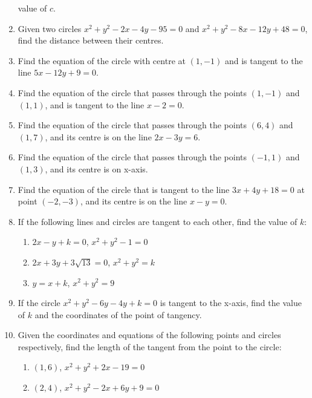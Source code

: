 \documentclass{report}
\begin{document}
\begin{multicols}{2}
\begin{enumerate}
                  value of $c$.
            \item Given two circles $x^2 + y^2 - 2x - 4y - 95 = 0$ and $x^2 + y^2 - 8x - 12y + 48
                        = 0$, find the distance between their centres.
            \item Find the equation of the circle with centre at $(1, -1)$ and is tangent to the
                  line $5x - 12y + 9 = 0$.
            \item Find the equation of the circle that passes through the points $(1, -1)$ and
                  $(1, 1)$, and is tangent to the line $x - 2 = 0$.
            \item Find the equation of the circle that passes through the points $(6, 4)$ and
                  $(1, 7)$, and its centre is on the line $2x - 3y = 6$.
            \item Find the equation of the circle that passes through the points $(-1, 1)$ and
                  $(1, 3)$, and its centre is on x-axis.
            \item Find the equation of the circle that is tangent to the line $3x + 4y + 18 = 0$
                  at point $(-2, -3)$, and its centre is on the line $x - y = 0$.
            \item If the following lines and circles are tangent to each other, find the value of
                  $k$:
                  \begin{enumerate}
                        \item $2x - y + k = 0$, $x^2 + y^2 - 1 = 0$
                        \item $2x + 3y + 3\sqrt{13} = 0$, $x^2 + y^2 = k$
                        \item $y = x + k$, $x^2 + y^2 = 9$
                  \end{enumerate}
            \item If the circle $x^2 + y^2 - 6y - 4y + k = 0$ is tangent to the x-axis, find the
                  value of $k$ and the coordinates of the point of tangency.
            \item Given the coordinates and equations of the following points and circles
                  respectively, find the length of the tangent from the point to the circle:
                  \begin{enumerate}
                        \item $(1, 6)$, $x^2 + y^2 + 2x - 19 = 0$
                        \item $(2, 4)$, $x^2 + y^2 - 2x + 6y + 9 = 0$

\end{enumerate}
\end{enumerate}
\end{multicols}
\end{document}
